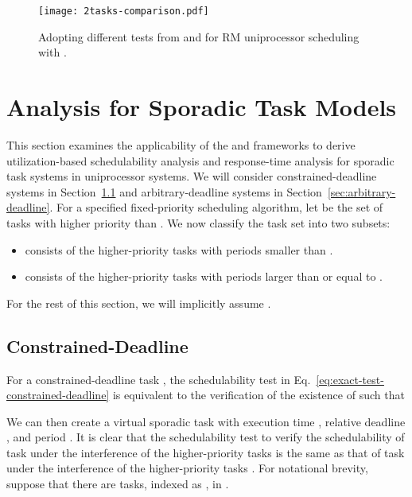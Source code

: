 \documentclass[10pt,conference]{IEEEtran}
\newcommand{\frameworkkq}[1]{}
\newcommand{\frameworkku}[1]{}
\begin{document}
\begin{figure}[t]
   \centering
  \texttt{[image: 2tasks-comparison.pdf]}
  \caption{Adopting different tests from \frameworkku{} and \frameworkkq{} for RM uniprocessor scheduling with .}
    \label{fig:2tasks-example-rm}
\end{figure}



\section{Analysis for Sporadic Task Models}
\label{sec:sporadic}

This section examines the applicability of the \frameworkku{} and
\frameworkkq{} frameworks to derive utilization-based schedulability
analysis and response-time analysis for sporadic task systems in
uniprocessor systems. We will consider constrained-deadline systems in
Section~\ref{sec:constrained-deadline} and arbitrary-deadline systems
in Section~\ref{sec:arbitrary-deadline}.  For a specified
fixed-priority scheduling algorithm, let  be the set of
tasks with higher priority than . We now classify the task set
 into two subsets:
\begin{itemize}
\item  consists of the higher-priority tasks with periods
  smaller than .
\item  consists of the higher-priority tasks with periods
  larger than or equal to .
\end{itemize}
For the rest of this section, we will implicitly assume .


\subsection{Constrained-Deadline}
\label{sec:constrained-deadline}

For a constrained-deadline task , the schedulability test in
Eq.~\eqref{eq:exact-test-constrained-deadline}  is equivalent to the
verification of the existence of  such that

We can then create a virtual sporadic task  with execution
time , relative
deadline , and period . It is
clear that the schedulability test to verify the schedulability of
task  under the interference of the higher-priority tasks
 is the same as that of task  under the
interference of the higher-priority tasks .
For notational brevity, suppose that there are  tasks, indexed
as , in
. 
\end{document}
